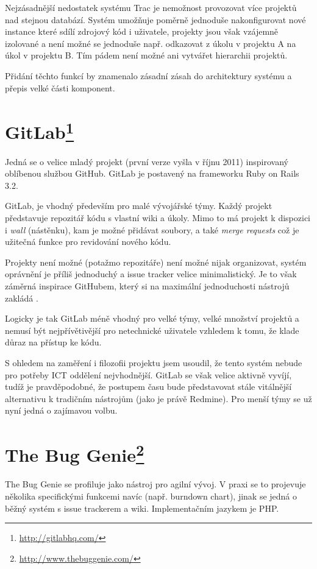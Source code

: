 \documentclass[thesis=B,czech]{FITthesis}[2012/05/02]
\begin{document}
Nejzásadnější nedostatek systému Trac je nemožnost provozovat více
projektů nad stejnou databází. Systém umožňuje poměrně jednoduše
nakonfigurovat nové instance které sdílí zdrojový kód i uživatele,
projekty jsou však vzájemně izolované a není možné se jednoduše např.
odkazovat z úkolu v projektu A na úkol v projektu B. Tím pádem není
možné ani vytvářet hierarchii projektů.

Přidání těchto funkcí by znamenalo zásadní zásah do architektury systému
a přepis velké části komponent.

\section[GitLab]{GitLab\footnote{\url{http://gitlabhq.com/}}}

Jedná se o velice mladý projekt (první verze vyšla v říjnu 2011)
inspirovaný oblíbenou službou GitHub. GitLab je postavený na frameworku
Ruby on Rails 3.2.

GitLab, je vhodný především pro malé vývojářské týmy. Každý projekt
představuje repozitář kódu s vlastní wiki a úkoly. Mimo to má projekt k
dispozici i \emph{wall} (nástěnku), kam je možné přidávat soubory, a také
\emph{merge requests} což je užitečná funkce pro revidování nového kódu.

Projekty není možné (potažmo repozitáře) není možné nijak organizovat,
systém oprávnění je příliš jednoduchý a issue tracker velice
minimalistický. Je to však záměrná inspirace GitHubem, který si na
maximální jednoduchosti nástrojů zakládá \citep[snímky
55-71]{Holman2011}.

Logicky je tak GitLab méně vhodný pro velké týmy, velké množství
projektů a nemusí být nejpřívětivější pro netechnické uživatele vzhledem
k tomu, že klade důraz na přístup ke kódu.

S ohledem na zaměření i filozofii projektu jsem usoudil, že tento systém
nebude pro potřeby ICT oddělení nejvhodnější. GitLab se však velice
aktivně vyvíjí, tudíž je pravděpodobné, že postupem času bude
představovat stále vitálnější alternativu k tradičním nástrojům (jako je
právě Redmine). Pro menší týmy se už nyní jedná o zajímavou volbu.

\section[The Bug Genie]{The Bug Genie\footnote{\url{http://www.thebuggenie.com/}}}

The Bug Genie se profiluje jako nástroj pro agilní vývoj. V praxi se to
projevuje několika specifickými funkcemi navíc (např. burndown chart),
jinak se jedná o běžný systém s issue trackerem a wiki. Implementačním
jazykem je PHP.
\end{document}
